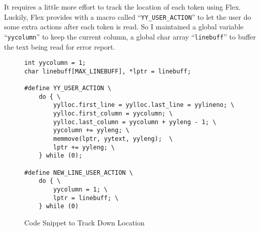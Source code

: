 \documentclass[10pt, a4paper]{article}
\begin{document}
It requires a little more effort to track the location of each token using
Flex. Luckily, Flex provides with a macro called ``\texttt{YY\_USER\_ACTION}''
to let the user do some extra actions after each token is read. So I maintained
a global variable ``\texttt{yycolumn}'' to keep the current column, a global
char array ``\texttt{linebuff}'' to buffer the text being read for error
report.
\begin{figure}
    \centering
    \begin{verbatim}
int yycolumn = 1;
char linebuff[MAX_LINEBUFF], *lptr = linebuff;

#define YY_USER_ACTION \
    do { \
        yylloc.first_line = yylloc.last_line = yylineno; \
        yylloc.first_column = yycolumn; \
        yylloc.last_column = yycolumn + yyleng - 1; \
        yycolumn += yyleng; \
        memmove(lptr, yytext, yyleng);  \
        lptr += yyleng; \
    } while (0);

#define NEW_LINE_USER_ACTION \
    do { \
        yycolumn = 1; \
        lptr = linebuff; \
    } while (0)
\end{verbatim}
\caption {Code Snippet to Track Down Location}
\end{figure}
\end{document}
